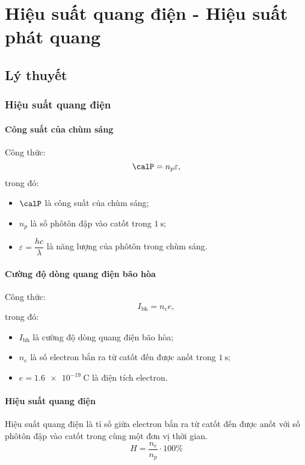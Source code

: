 
\chapter[Hiệu suất quang điện - Hiệu suất phát quang]{Hiệu suất quang điện - Hiệu suất phát quang}
\section{Lý thuyết}

\subsection{Hiệu suất quang điện}

\subsubsection{Công suất của chùm sáng}
Công thức:
\begin{equation}
	\calP=n_p\varepsilon,
\end{equation}
trong đó:
\begin{itemize}
	\item $\calP$ là công suất của chùm sáng;
	\item $n_p$ là số phôtôn đập vào catốt trong $\SI{1}{\second}$;
	\item $\varepsilon=\dfrac{hc}{\lambda}$ là năng lượng của phôtôn trong chùm sáng.
\end{itemize}
\subsubsection{Cường độ dòng quang điện bão hòa}
Công thức:
\begin{equation}
	I_\text{bh}=n_e e,
\end{equation}
trong đó:
\begin{itemize}
	\item $I_\text{bh}$ là cường độ dòng quang điện bão hòa;
	\item $n_e$ là số electron bắn ra từ catốt đến được anốt trong $\SI{1}{\second}$;
	\item $e=\SI{1.6e-19}{\coulomb}$ là điện tích electron.
\end{itemize}	
\subsubsection{Hiệu suất quang điện}
Hiệu suất quang điện là tỉ số giữa electron bắn ra từ catốt đến được anốt với số phôtôn đập vào catốt trong cùng một đơn vị thời gian.
\begin{equation}
	H = \dfrac{n_e}{n_p} \cdot 100 \%
\end{equation}

